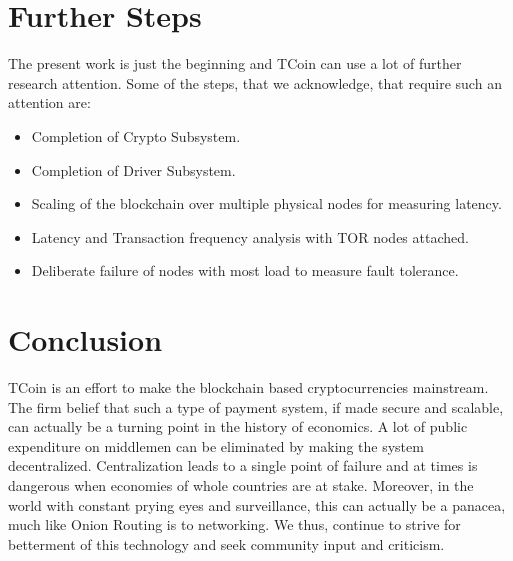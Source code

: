 \documentclass[conference,a4paper,12pt]{IEEEtran}
\begin{document}
\section{Further Steps}
The present work is just the beginning and TCoin can use a lot of further research attention. Some of the steps, that we acknowledge, that require such an attention are:
\begin{itemize}

\item{Completion of Crypto Subsystem.}
\item{Completion of Driver Subsystem.}
\item{Scaling of the blockchain over multiple physical nodes for measuring latency.}
\item{Latency and Transaction frequency analysis with TOR nodes attached.}
\item{Deliberate failure of nodes with most load to measure fault tolerance.}

\end{itemize}

\section{Conclusion}
TCoin is an effort to make the blockchain based cryptocurrencies mainstream. The firm belief that such a type of payment system, if made secure and scalable, can actually be a turning point in the history of economics. A lot of public expenditure on middlemen can be eliminated by making the system decentralized. Centralization leads to a single point of failure and at times is dangerous when economies of whole countries are at stake. Moreover, in the world with constant prying eyes and surveillance, this can actually be a panacea, much like Onion Routing is to networking. We thus, continue to strive for betterment of this technology and seek community input and criticism.

\newpage
 

\end{document}
